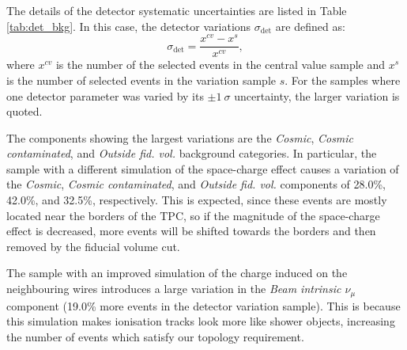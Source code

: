 The details of the detector systematic uncertainties are listed in Table \ref{tab:det_bkg}. In this case, the detector variations $\sigma_{\mathrm{det}}$ are defined as:
\begin{equation}
    \sigma_{\mathrm{det}} = \frac{x^{cv} - x^s}{x^{cv}},
\end{equation}
where $x^{cv}$ is the number of the selected events in the central value sample and $x^s$ is the number of selected events in the variation sample $s$. For the samples where one detector parameter was varied by its $\pm1~\sigma$ uncertainty, the larger variation is quoted.

The components showing the largest variations are the \emph{Cosmic}, \emph{Cosmic contaminated}, and \emph{Outside fid. vol.} background categories. In particular, the sample with a different simulation of the space-charge effect causes a variation of the \emph{Cosmic}, \emph{Cosmic contaminated}, and \emph{Outside fid. vol.} components of 28.0\%, 42.0\%, and 32.5\%, respectively. This is expected, since these events are mostly located near the borders of the TPC, so if the magnitude of the space-charge effect is decreased, more events will be shifted towards the borders and then removed by the fiducial volume cut.

The sample with an improved simulation of the charge induced on the neighbouring wires introduces a large variation in the \emph{Beam intrinsic $\nu_{\mu}$} component (19.0\% more events in the detector variation sample). This is because this simulation makes ionisation tracks look more like shower objects, increasing the number of events which satisfy our topology requirement.


